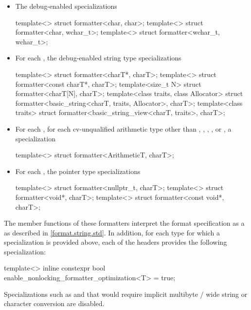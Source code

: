 \begin{itemize}
\item
{}%
The debug-enabled specializations
\begin{codeblock}
template<> struct formatter<char, char>;
template<> struct formatter<char, wchar_t>;
template<> struct formatter<wchar_t, wchar_t>;
\end{codeblock}

\item
{}%
For each ,
the debug-enabled string type specializations
\begin{codeblock}
template<> struct formatter<charT*, charT>;
template<> struct formatter<const charT*, charT>;
template<size_t N> struct formatter<charT[N], charT>;
template<class traits, class Allocator>
  struct formatter<basic_string<charT, traits, Allocator>, charT>;
template<class traits>
  struct formatter<basic_string_view<charT, traits>, charT>;
\end{codeblock}

\item
{}%
For each ,
for each cv-unqualified arithmetic type 
other than
,
,
,
, or
,
a specialization
\begin{codeblock}
template<> struct formatter<ArithmeticT, charT>;
\end{codeblock}

\item
{}%
%
For each ,
the pointer type specializations
\begin{codeblock}
template<> struct formatter<nullptr_t, charT>;
template<> struct formatter<void*, charT>;
template<> struct formatter<const void*, charT>;
\end{codeblock}
\end{itemize}
The  member functions of these formatters
interpret the format specification
as a 
as described in \ref{format.string.std}.
In addition,
for each type  for which
a  specialization is provided above,
each of the headers provides the following specialization:
\begin{codeblock}
template<> inline constexpr bool enable_nonlocking_formatter_optimization<T> = true;
\end{codeblock}
\begin{note}
Specializations such as 
and 
that would require implicit
multibyte / wide string or character conversion are disabled.
\end{note}

